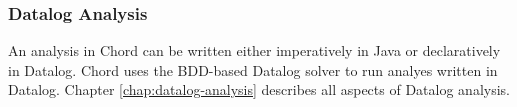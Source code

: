 \subsubsection*{Datalog Analysis}

An analysis in Chord can be written either imperatively in Java or declaratively in Datalog.
Chord uses the BDD-based Datalog solver  to
run analyes written in Datalog.
Chapter \ref{chap:datalog-analysis} describes all aspects of Datalog analysis.

